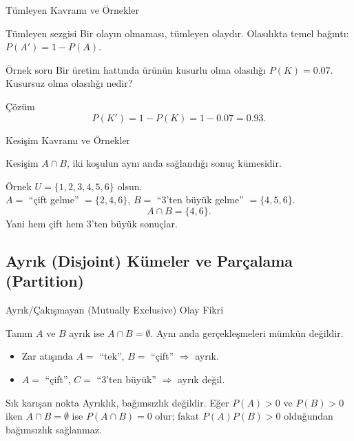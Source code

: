 \documentclass[light]{lutbeamer}
\begin{document}
\begin{frame}{Tümleyen Kavramı ve Örnekler}
    \begin{block}{Tümleyen sezgisi}
        Bir olayın olmaması, tümleyen olaydır.
        Olasılıkta temel bağıntı: $P(A')=1-P(A)$.
    \end{block}

    \begin{exampleblock}{Örnek soru}
        Bir üretim hattında ürünün kusurlu olma olasılığı $P(K)=0.07$.
        Kusursuz olma olasılığı nedir?
    \end{exampleblock}

    \begin{block}{Çözüm}
        \[
            P(K')=1-P(K)=1-0.07=0.93.
        \]
    \end{block}
\end{frame}

\begin{frame}{Kesişim Kavramı ve Örnekler}
    \begin{block}{Kesişim}
        $A\cap B$, iki koşulun aynı anda sağlandığı sonuç kümesidir.
    \end{block}

    \begin{exampleblock}{Örnek}
        $U=\{1,2,3,4,5,6\}$ olsun. \\
        $A=$ ``çift gelme'' $=\{2,4,6\}$, 
        $B=$ ``3'ten büyük gelme'' $=\{4,5,6\}$.
        \[
            A\cap B=\{4,6\}.
        \]
        Yani hem çift hem 3'ten büyük sonuçlar.
    \end{exampleblock}
\end{frame}

\subsection{Ayrık (Disjoint) Kümeler ve Parçalama (Partition)}
\begin{frame}{Ayrık/Çakışmayan (Mutually Exclusive) Olay Fikri}
    \begin{block}{Tanım}
        $A$ ve $B$ ayrık ise $A\cap B=\emptyset$.
        Aynı anda gerçekleşmeleri mümkün değildir.
    \end{block}

    \begin{itemize}
        \item Zar atışında $A=$ ``tek'', $B=$ ``çift'' $\Rightarrow$ ayrık.
        \item $A=$ ``çift'', $C=$ ``3'ten büyük'' $\Rightarrow$ ayrık değil.
    \end{itemize}

    \begin{alertblock}{Sık karışan nokta}
        Ayrıklık, bağımsızlık değildir.
        Eğer $P(A)>0$ ve $P(B)>0$ iken $A\cap B=\emptyset$ ise
        $P(A\cap B)=0$ olur; fakat $P(A)P(B)>0$ olduğundan bağımsızlık sağlanmaz.
    \end{alertblock}
\end{frame}
\end{document}
